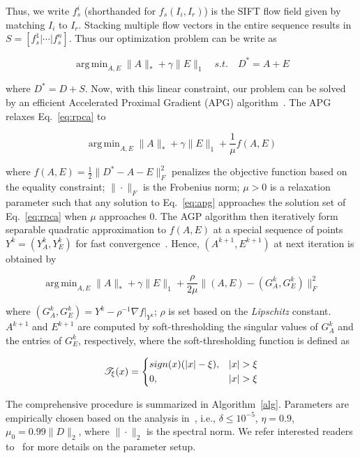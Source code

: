 \documentclass[journal]{IEEEtran}
\DeclareMathOperator*{\argmin}{arg\,min}
\begin{document}
Thus, we write $f_s^i$ (shorthanded for $f_s(I_i,I_r)$) is the SIFT flow field given by matching $I_i$ to $I_r$. Stacking multiple flow vectors in the entire sequence results in $S = [f_s^1 | \cdots | f_s^n]$. Thus our optimization problem can be write as

\begin{equation} \label{eq:rpca}
\argmin_{A,E} \|A\|_*+\gamma \|E\|_1  \quad s.t. \quad D^* = A + E 
\end{equation}

where $D^*=D+S$. Now, with this linear constraint, our problem can be solved by an efficient Accelerated Proximal Gradient (APG) algorithm~\cite{Beck09}\cite{Toh09}\cite{Lin09}. The APG relaxes Eq.~\ref{eq:rpca} to

\begin{equation} \label{eq:apg}
\argmin_{A,E} \|A\|_* + \gamma \|E\|_1 + \frac{1}{\mu}f(A,E)
\end{equation}

\noindent where $f(A,E)=\frac{1}{2}\|D^*-A-E\|^2_F$ penalizes the objective function based on the equality constraint; $\|\cdot\|_F$ is the Frobenius norm; $\mu>0$ is a relaxation parameter such that any solution to Eq.~\ref{eq:apg} approaches the solution set of Eq.~\ref{eq:rpca} when $\mu$ approaches 0. The AGP algorithm then iteratively form separable quadratic approximation to $f(A,E)$ at a special sequence of points $Y^k=(Y^k_A,Y^k_E)$ for fast convergence~\cite{Beck09}. Hence, $(A^{k+1},E^{k+1})$ at next iteration is obtained by

\begin{equation} \label{eq:apg_fast}
\argmin_{A,E} \|A\|_* + \gamma \|E\|_1 + \frac{\rho}{2\mu}\|(A,E)-(G^k_A,G^k_E)\|^2_F
\end{equation}

\noindent where $(G^k_A,G^k_E)=Y^k-\rho^{-1}\nabla f|_{Y^k}$; $\rho$ is set based on the \textit{Lipschitz} constant. $A^{k+1}$ and $E^{k+1}$ are computed by soft-thresholding the singular values of $G^k_A$ and the entries of $G^k_E$, respectively, where the soft-thresholding function is defined as

\begin{equation}
\mathscr{T}_\xi(x)=
	\begin{dcases}
    sign(x)(|x|-\xi),  	& |x|>\xi \\
    0,  								& |x|>\xi
	\end{dcases}
\end{equation}

The comprehensive procedure is summarized in Algorithm~\ref{alg}. Parameters are empirically chosen based on the analysis in~\cite{Lin09}, i.e., $\delta\leq10^{-5}$, $\eta=0.9$, $\mu_0=0.99\|D\|_2$, where $\|\cdot\|_2$ is the spectral norm. We refer interested readers to~\cite{Lin09} for more details on the parameter setup. 
\end{document}
